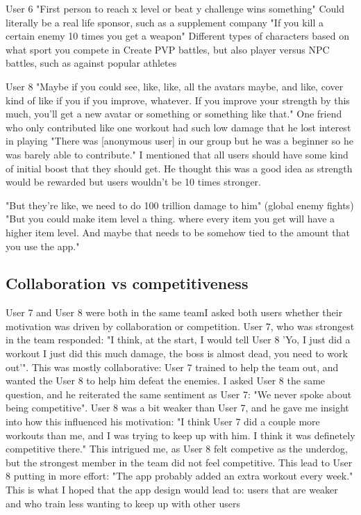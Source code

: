 \documentclass{l4proj}
\begin{document}
  User 6
  "First person to reach x level or beat y challenge wins something"
    Could literally be a real life sponsor, such as a supplement company
  "If you kill a certain enemy 10 times you get a weapon"
Different types of characters based on what sport you compete in
Create PVP battles, but also player versus NPC battles, such as against popular athletes

User 8
  "Maybe if you could see, like, like, all the avatars maybe, and like, cover kind of like if you if you improve, whatever. If you improve your strength by this much, you'll get a new avatar or something or something like that."
  One friend who only contributed like one workout had such low damage that he lost interest in playing
    "There was [anonymous user] in our group but he was a beginner so he was barely able to contribute."
      I mentioned that all users should have some kind of initial boost that they should get. He thought this was a good idea as strength would be rewarded but users wouldn't be 10 times stronger.

"But they're like, we need to do 100 trillion damage to him" (global enemy fights)
"But you could make item level a thing. where every item you get will have a higher item level. And maybe that needs to be somehow tied to the amount that you use the app."



\subsection{Collaboration vs competitiveness}
User 7 and User 8 were both in the same teamI asked both users whether their motivation was driven by collaboration or competition. User 7, who was strongest in the team responded: "I think, at the start, I would tell User 8 'Yo, I just did a workout I just did this much damage, the boss is almost dead, you need to work out'". This was mostly collaborative: User 7 trained to help the team out, and wanted the User 8 to help him defeat the enemies. I asked User 8 the same question, and he reiterated the same sentiment as User 7: "We never spoke about being competitive". User 8 was a bit weaker than User 7, and he gave me insight into how this influenced his motivation: "I think User 7 did a couple more workouts than me, and I was trying to keep up with him. I think it was definetely competitive there." This intrigued me, as User 8 felt competive as the underdog, but the strongest member in the team did not feel competitive. This lead to User 8 putting in more effort: "The app probably added an extra workout every week." This is what I hoped that the app design would lead to: users that are weaker and who train less wanting to keep up with other users
\end{document}
